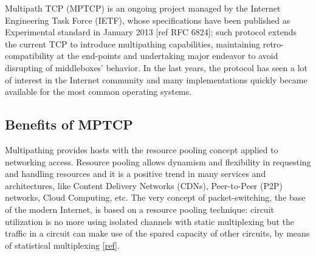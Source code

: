 Multipath TCP (MPTCP) is an ongoing project managed by the Internet Engineering Task Force (IETF), whose specifications have been published as Experimental standard in January 2013 [ref RFC 6824]; such protocol extends the current TCP to introduce multipathing capabilities, maintaining retro-compatibility at the end-points and undertaking major endeavor to avoid disrupting of middleboxes' behavior. In the last years, the protocol has seen a lot of interest in the Internet community and many implementations quickly became available for the most common operating systems.

\subsection{Benefits of MPTCP}
Multipathing provides hosts with the resource pooling concept applied to networking access. Resource pooling allows dynamism and flexibility in requesting and handling resources and it is a positive trend in many services and architectures, like Content Delivery Networks (CDNs), Peer-to-Peer (P2P) networks, Cloud Computing, etc. The very concept of packet-switching, the base of the modern Internet, is based on a resource pooling technique: circuit utilization is no more using isolated channels with static multiplexing but the traffic in a circuit can make use of the spared capacity of other circuits, by means of statistical multiplexing [\href{https://www.cl.cam.ac.uk/~as2330/docs/multipath-survey.pdf}{ref}].


